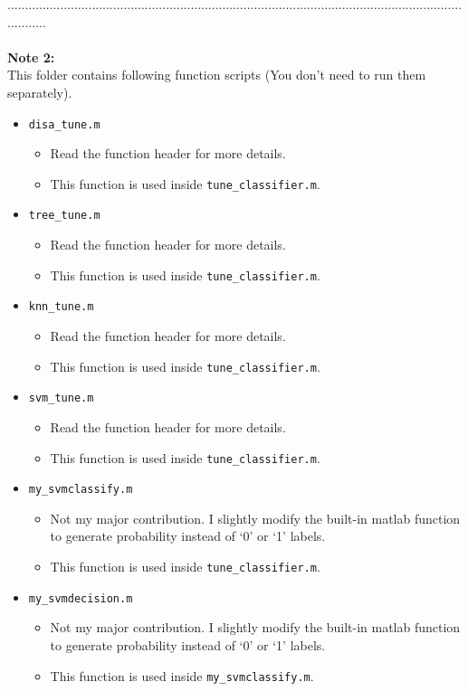 \documentclass[a4paper,12pt]{article} %
\begin{document}
............................................................................................................................................\\\\
\textbf{Note 2: }\\
This folder contains following function scripts (You don't need to run them separately).
\begin{itemize}
	
	\item \verb|disa_tune.m|
	\begin{itemize}
		\item Read the function header for more details.
		\item This function is used inside \verb|tune_classifier.m|.
	\end{itemize}
	\item \verb|tree_tune.m|
	\begin{itemize}
		\item Read the function header for more details.
		\item This function is used inside \verb|tune_classifier.m|.
	\end{itemize}
	\item \verb|knn_tune.m|
	\begin{itemize}
		\item Read the function header for more details.
		\item This function is used inside \verb|tune_classifier.m|.
	\end{itemize}
	\item \verb|svm_tune.m|
	\begin{itemize}
		\item Read the function header for more details.
		\item This function is used inside \verb|tune_classifier.m|.
	\end{itemize}
	\item \verb|my_svmclassify.m|
	\begin{itemize}
		\item Not my major contribution. I slightly modify the built-in matlab function to generate probability instead of `0' or `1' labels. 
		\item This function is used inside \verb|tune_classifier.m|.
	\end{itemize}
	\item \verb|my_svmdecision.m|
	\begin{itemize}
		\item Not my major contribution. I slightly modify the built-in matlab function to generate probability instead of `0' or `1' labels. 
		\item This function is used inside \verb|my_svmclassify.m|.
	\end{itemize}
	
\end{itemize}
\end{document}
